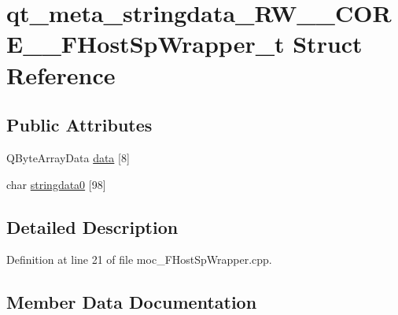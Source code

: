 \hypertarget{structqt__meta__stringdata___r_w_____c_o_r_e_____f_host_sp_wrapper__t}{}\section{qt\+\_\+meta\+\_\+stringdata\+\_\+\+R\+W\+\_\+\+\_\+\+C\+O\+R\+E\+\_\+\+\_\+\+F\+Host\+Sp\+Wrapper\+\_\+t Struct Reference}
\label{structqt__meta__stringdata___r_w_____c_o_r_e_____f_host_sp_wrapper__t}
\subsection*{Public Attributes}
\begin{DoxyCompactItemize}
\item 
Q\+Byte\+Array\+Data \hyperlink{structqt__meta__stringdata___r_w_____c_o_r_e_____f_host_sp_wrapper__t_aae021c0f6e31cd9a2ea438476facc0ee}{data} \mbox{[}8\mbox{]}
\item 
char \hyperlink{structqt__meta__stringdata___r_w_____c_o_r_e_____f_host_sp_wrapper__t_a9d1313b4195bca5e48e5fba152725df4}{stringdata0} \mbox{[}98\mbox{]}
\end{DoxyCompactItemize}


\subsection{Detailed Description}


Definition at line 21 of file moc\+\_\+\+F\+Host\+Sp\+Wrapper.\+cpp.



\subsection{Member Data Documentation}
\hypertarget{structqt__meta__stringdata___r_w_____c_o_r_e_____f_host_sp_wrapper__t_aae021c0f6e31cd9a2ea438476facc0ee}{}\label{structqt__meta__stringdata___r_w_____c_o_r_e_____f_host_sp_wrapper__t_aae021c0f6e31cd9a2ea438476facc0ee} 
